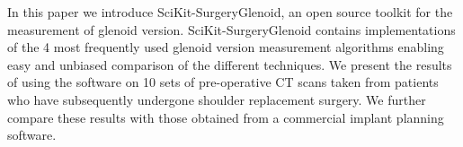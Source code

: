 In this paper we introduce SciKit-SurgeryGlenoid, an open source toolkit for the measurement
of glenoid version. SciKit-SurgeryGlenoid contains implementations of the 4 most    
frequently used glenoid version measurement algorithms enabling easy and unbiased comparison of
the different techniques. We present the results of using the software on 10 sets of
pre-operative CT scans taken from patients who have subsequently undergone shoulder replacement surgery. We further compare these results with those obtained from a commercial
implant planning software.

